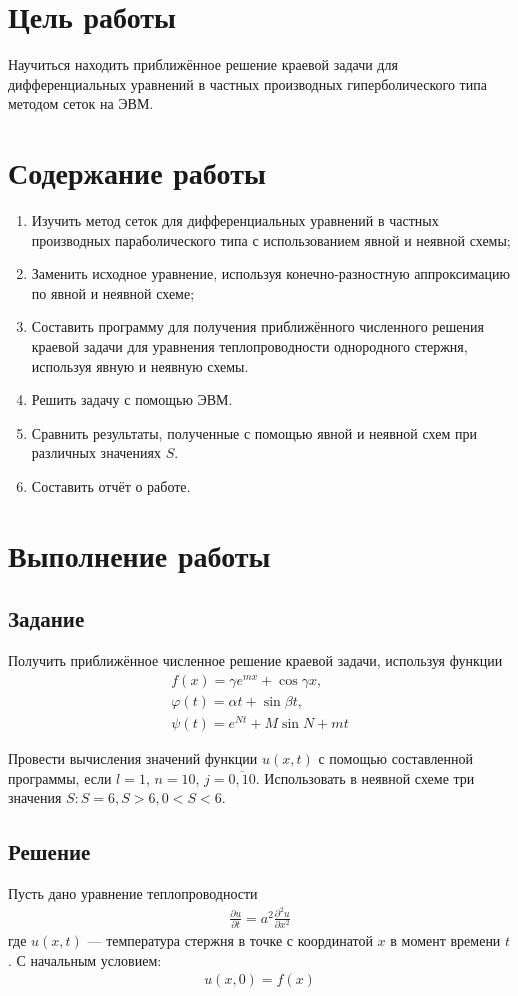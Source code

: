 \section{Цель работы}
Научиться находить приближённое решение краевой задачи для дифференциальных уравнений в частных производных гиперболического типа методом сеток на ЭВМ.

\section{Содержание работы}
\begin{enumerate}
	\item Изучить метод сеток для дифференциальных уравнений в частных производных параболического типа с использованием явной и неявной схемы;
	\item Заменить исходное уравнение, используя конечно-разностную аппроксимацию по явной и неявной схеме;
	\item Составить программу для получения приближённого численного решения краевой задачи для уравнения теплопроводности однородного стержня, используя явную и неявную схемы.
	\item Решить задачу с помощью ЭВМ.
	\item Сравнить результаты, полученные с помощью явной и неявной схем при различных значениях \(S\).
	\item Составить отчёт о работе.
\end{enumerate}

\section{Выполнение работы}
\subsection{Задание}
Получить приближённое численное решение краевой задачи, используя функции
\begin{align}
	f(x) = \gamma e^{m x} + \cos{\gamma x}, \\
	\varphi(t) = \alpha t + \sin{\beta t},  \\
	\psi(t) = e^{N t} + M \sin{N + m t}
\end{align}

Провести вычисления значений функции \(u(x,t)\) с помощью составленной программы, если \(l = 1\), \(n = 10\), \(j = \overline{0, 10}\). Использовать в неявной схеме три значения \(S\colon S=6, S>6, 0<S<6\).

\subsection{Решение}
Пусть дано уравнение теплопроводности
\begin{align} \label{eq:init-u-diff}
	\frac{\partial u}{\partial t} = a^2 \frac{\partial^2 u}{\partial x^2}
\end{align}
где \(u(x,t)\) ---  температура стержня в точке с координатой \(x\) в момент времени \(t\).
С начальным условием:
\begin{align}\label{eq:init-cond}
	u(x, 0) = f(x)
\end{align}

